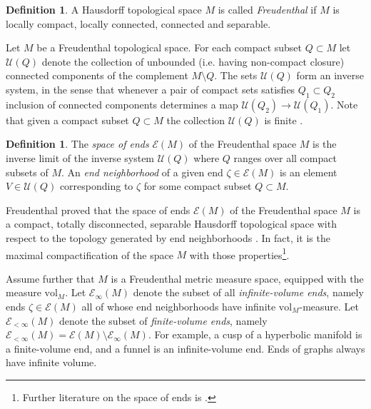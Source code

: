\documentclass{amsart}
\newcommand{\Ends}[1]{\mathcal{E}\left(#1\right)}
\newcommand{\EndsFin}[1]{\mathcal{E}_{<\infty}\left(#1\right)}
\newcommand{\EndsInf}[1]{\mathcal{E}_{\infty}\left(#1\right)}
\theoremstyle{plain}
\numberwithin{equation}{section}
\theoremstyle{definition}
\newtheorem{definition}[theorem]{Definition}
\begin{document}
\begin{definition}
\label{def:Freudenthal}
A Hausdorff topological space $M$ is called \emph{Freudenthal} if $M$ is locally compact, locally connected, connected and separable. 
\end{definition}

Let $M$ be a Freudenthal topological space.   For each compact subset $Q \subset M$ let $\mathcal{U}(Q)$ denote the collection of unbounded (i.e. having non-compact closure) connected components of the complement $M \setminus Q$.  
The  sets $\mathcal U(Q)$ form an inverse system, in the sense that whenever a pair of compact sets satisfies $Q_1 \subset Q_2$ inclusion of connected components determines a map $\mathcal U(Q_2) \to \mathcal U(Q_1)$. 
Note that given a compact subset $Q \subset M$ the collection $ \mathcal U(Q)$ is finite \cite[Lemma 1.1]{raymond1960end}.

\begin{definition}
\label{def:space of ends}
The \emph{space of ends} $\Ends{M}$ of the Freudenthal space $M$ is the inverse limit of the inverse system $\mathcal U(Q)$ where $Q$ ranges over all compact subsets of $M$. An \emph{end neighborhood} of a given end $\zeta \in \Ends{M}$ is an element $V \in \mathcal{U}(Q)$ corresponding to $\zeta$ for some compact subset $Q \subset M$.
\end{definition}

Freudenthal proved that the space of ends $\Ends{M}$ of the Freudenthal space $M$ is a compact, totally disconnected, separable Hausdorff topological space with respect to the topology generated by end neighborhoods \cite{freudenthal1931enden}. In fact, it is the maximal compactification of the space $M$ with those properties\footnote{Further literature on the space of ends is \cite{
raymond1960end,
siebenmann1965obstruction,
peschke1990theory,
hughes1996ends,
guilbault2021endsshapesboundariesmanifold,
axon2025end,
bass2025ends}.}.

Assume further that $M$ is a Freudenthal metric measure space, equipped with the measure $\mathrm{vol}_M$. Let $\EndsInf{M}$ denote the subset of all \emph{infinite-volume ends}, namely ends $\zeta\in \Ends{M}$ all of whose end neighborhoods have infinite $\mathrm{vol}_M$-measure.
Let $\EndsFin{M}$ denote the subset of \emph{finite-volume ends}, namely $\EndsFin{M} = \Ends{M}\setminus \EndsInf{M}$. 
For example, a cusp of a hyperbolic manifold is a finite-volume end, and a funnel is an infinite-volume end. Ends of graphs always have infinite volume. 
\end{document}
